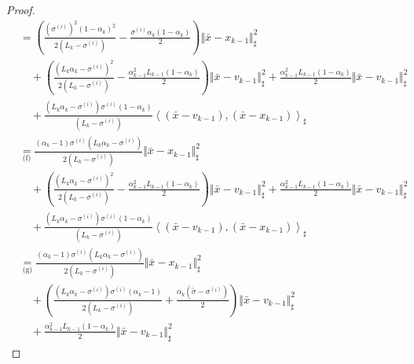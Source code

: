 \documentclass[12pt]{article}
\begin{document}
\begin{proof}
{\begin{align*}
            &= 
            \left(
                \frac{(\sigma^{(i)})^2(1 - \alpha_k)^2}{2(L_k - \sigma^{(i)})} - \frac{\sigma^{(i)}\alpha_k(1 - \alpha_k)}{2}
            \right)\Vert \bar x - x_{k - 1}\Vert^2_\sharp
                \\ &\quad 
                + \left(
                    \frac{(L_k\alpha_k - \sigma^{(i)})^2}{2(L_k - \sigma^{(i)})} - \frac{\alpha_{k - 1}^2L_{k - 1}(1 - \alpha_k)}{2}
                \right) \Vert \bar x - v_{k - 1}\Vert^2_\sharp
                + \frac{\alpha_{k - 1}^2L_{k - 1}(1 - \alpha_k)}{2} \Vert \bar x - v_{k - 1}\Vert^2_\sharp
                \\&\quad 
                + \frac{(L_k\alpha_k  - \sigma^{(i)})\sigma^{(i)}(1 - \alpha_k)}{(L_k - \sigma^{(i)})}\left\langle (\bar x - v_{k - 1}),(\bar x - x_{k - 1})\right\rangle_\sharp
            \\
            &\underset{\text{(f)}}{=}
            \frac{(\alpha_k - 1)\sigma^{(i)}\left(L_k\alpha_k - \sigma^{(i)}\right)}
            {2\left(L_k - \sigma^{(i)}\right)} \Vert \bar x - x_{k - 1}\Vert^2_\sharp
                \\ &\quad 
                + \left(
                    \frac{(L_k\alpha_k - \sigma^{(i)})^2}{2(L_k - \sigma^{(i)})} - \frac{\alpha_{k - 1}^2L_{k - 1}(1 - \alpha_k)}{2}
                \right) \Vert \bar x - v_{k - 1}\Vert^2_\sharp
                + \frac{\alpha_{k - 1}^2L_{k - 1}(1 - \alpha_k)}{2} \Vert \bar x - v_{k - 1}\Vert^2_\sharp
                \\&\quad 
                + \frac{(L_k\alpha_k  - \sigma^{(i)})\sigma^{(i)}(1 - \alpha_k)}{(L_k - \sigma^{(i)})}\left\langle (\bar x - v_{k - 1}),(\bar x - x_{k - 1})\right\rangle_\sharp
            \\
            & \underset{\text{(g)}}{=} 
            \frac{(\alpha_k - 1)\sigma^{(i)}\left(L_k\alpha_k - \sigma^{(i)}\right)}
            {2\left(L_k - \sigma^{(i)}\right)}\Vert \bar x - x_{k - 1}\Vert^2_\sharp
                \\ &\quad 
                + \left(
                    \frac{
                        \left(L_k \alpha_k - \sigma^{(i)}\right)\sigma^{(i)}
                        \left(\alpha_k - 1\right)
                    }
                    {2(L_k - \sigma^{(i)})}
                    + \frac{\alpha_k(\tilde\sigma - \sigma^{(i)})}{2}
                \right) 
                \Vert \bar x - v_{k - 1}\Vert^2_\sharp
                \\ &\quad 
                + \frac{\alpha_{k - 1}^2L_{k - 1}(1 - \alpha_k)}{2} \Vert \bar x - v_{k - 1}\Vert^2_\sharp

\end{align*}}
\end{proof}
\end{document}
